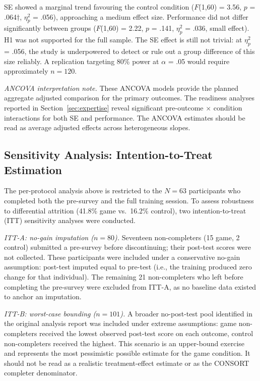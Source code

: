 \documentclass[12pt]{report}
\begin{document}
SE showed a marginal trend favouring the control condition ($F$(1,60) = 3.56, $p$ = .064$\dagger$, $\eta^2_p$ = .056), approaching a medium effect size. Performance did not differ significantly between groups ($F$(1,60) = 2.22, $p$ = .141, $\eta^2_p$ = .036, small effect). H1 was not supported for the full sample. The SE effect is still not trivial: at $\eta^2_p$ = .056, the study is underpowered to detect or rule out a group difference of this size reliably. A replication targeting 80\% power at $\alpha$ = .05 would require approximately $n = 120$.

\noindent\textit{ANCOVA interpretation note.} These ANCOVA models provide the planned aggregate adjusted comparison for the primary outcomes. The readiness analyses reported in Section~\ref{sec:expertise} reveal significant pre-outcome $\times$ condition interactions for both SE and performance. The ANCOVA estimates should be read as average adjusted effects across heterogeneous slopes.

\subsection*{Sensitivity Analysis: Intention-to-Treat Estimation}

The per-protocol analysis above is restricted to the $N = 63$ participants who completed both the pre-survey and the full training session. To assess robustness to differential attrition (41.8\% game vs.\ 16.2\% control), two intention-to-treat (ITT) sensitivity analyses were conducted.

\textit{ITT-A: no-gain imputation ($n = 80$).} Seventeen non-completers (15 game, 2 control) submitted a pre-survey before discontinuing; their post-test scores were not collected. These participants were included under a conservative no-gain assumption: post-test imputed equal to pre-test (i.e., the training produced zero change for that individual). The remaining 21 non-completers who left before completing the pre-survey were excluded from ITT-A, as no baseline data existed to anchor an imputation.

\textit{ITT-B: worst-case bounding ($n = 101$).} A broader no-post-test pool identified in the original analysis report was included under extreme assumptions: game non-completers received the lowest observed post-test score on each outcome, control non-completers received the highest. This scenario is an upper-bound exercise and represents the most pessimistic possible estimate for the game condition. It should not be read as a realistic treatment-effect estimate or as the CONSORT completer denominator.
\end{document}
